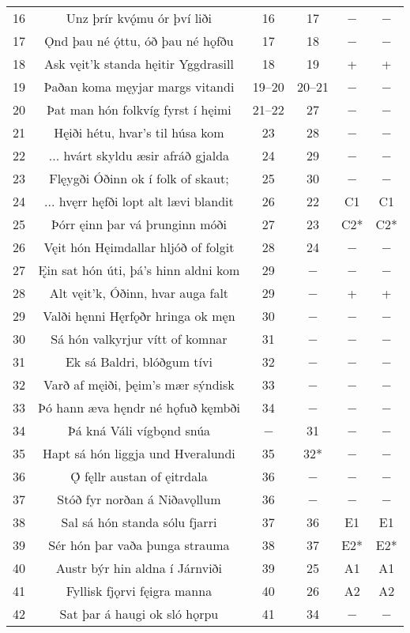 {\begin{longtable}{|c c c c c c|}
	16 & Unz þrír kvǫ́mu ór því liði & 16 & 17 & − & − \\
	17 & Ǫnd þau né ǫ́ttu, óð þau né hǫfðu & 17 & 18 & − & − \\
	18 & Ask vęit’k standa hęitir Yggdrasill & 18 & 19 & + & + \\
	19 & Þaðan koma męyjar margs vitandi & 19–20 & 20–21 & − & − \\
	20 & Þat man hón folkvíg fyrst í hęimi & 21–22 & 27 & − & − \\
	21 & Hęiði hétu, hvar’s til húsa kom & 23 & 28 & − & − \\
	22 & ... hvárt skyldu æsir afráð gjalda & 24 & 29 & − & − \\
	23 & Flęygði Óðinn ok í folk of skaut; & 25 & 30 & − & − \\
	24 & ... hvęrr hęfði lopt alt lævi blandit  & 26 & 22 & C1 & C1 \\
	25 & Þórr ęinn þar vá þrunginn móði & 27 & 23 & C2* & C2* \\
	26 & Vęit hón Hęimdallar hljóð of folgit & 28 & 24 & − & − \\
	27 & Ęin sat hón úti, þá’s hinn aldni kom & 29 & − & − & − \\
	28 & Alt vęit’k, Óðinn, hvar auga falt & 29 & − & + & + \\
	29 & Valði hęnni Hęrfǫðr hringa ok męn & 30 & − & − & − \\
	30 & Sá hón valkyrjur vítt of komnar & 31 & − & − & − \\
	31 & Ek sá Baldri, blóðgum tívi & 32 & − & − & − \\
	32 & Varð af męiði, þęim’s mær sýndisk & 33 & − & − & − \\
	33 & Þó hann æva hęndr né hǫfuð kęmbði & 34 & − & − & − \\
	34 & Þá kná Váli vígbǫnd snúa & − & 31 & − & − \\
	35 & Hapt sá hón liggja und Hveralundi & 35 & 32* & − & − \\
	36 & Ǫ́ fęllr austan of ęitrdala & 36 & − & − & − \\
	37 & Stóð fyr norðan á Niðavǫllum & 36 & − & − & − \\
	38 & Sal sá hón standa sólu fjarri & 37 & 36 & E1 & E1 \\
	39 & Sér hón þar vaða þunga strauma & 38 & 37 & E2* & E2* \\
	40 & Austr býr hin aldna í Járnviði & 39 & 25 & A1 & A1 \\
	41 & Fyllisk fjǫrvi fęigra manna & 40 & 26 & A2 & A2 \\
	42 & Sat þar á haugi ok sló hǫrpu & 41 & 34 & − & − \\

\end{longtable}}

